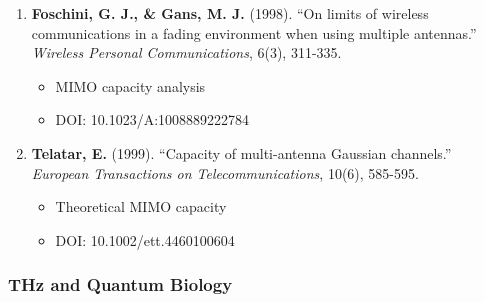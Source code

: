\begin{enumerate}
\def\labelenumi{\arabic{enumi}.}
\setcounter{enumi}{20}
\tightlist
\item
  \textbf{Foschini, G. J., \& Gans, M. J.} (1998). ``On limits of
  wireless communications in a fading environment when using multiple
  antennas.'' \emph{Wireless Personal Communications}, 6(3), 311-335.

  \begin{itemize}
  \tightlist
  \item
    MIMO capacity analysis
  \item
    DOI: 10.1023/A:1008889222784
  \end{itemize}
\item
  \textbf{Telatar, E.} (1999). ``Capacity of multi-antenna Gaussian
  channels.'' \emph{European Transactions on Telecommunications}, 10(6),
  585-595.

  \begin{itemize}
  \tightlist
  \item
    Theoretical MIMO capacity
  \item
    DOI: 10.1002/ett.4460100604
  \end{itemize}
\end{enumerate}

\subsubsection{THz and Quantum Biology}\label{thz-and-quantum-biology}

